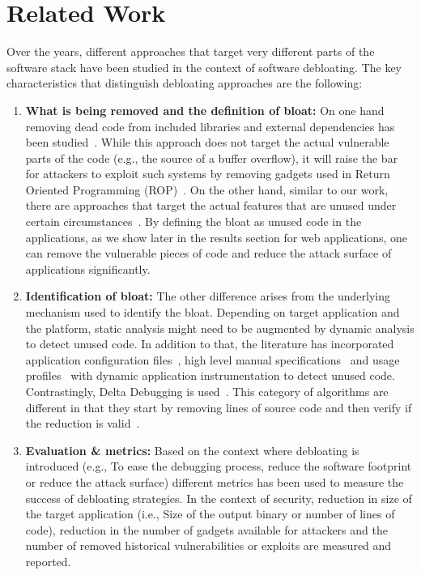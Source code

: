
\chapter{Related Work\label{ch:pastwork}}

Over the years, different approaches that target very different parts of the
software stack have been studied in the context of software debloating. The key characteristics that distinguish debloating approaches are the following:

\begin{enumerate}
  \item{\textbf{What is being removed and the definition of bloat:} On one hand removing dead code from included libraries and external dependencies has been studied~\cite{jiang2016Jred, jiang2018reddroid, quach2018debloating}. While this approach does not
  target the actual vulnerable parts of the code (e.g., the source of a buffer overflow), it will raise the bar for attackers to exploit such systems by removing gadgets used in Return Oriented Programming (ROP)~\cite{shacham2007geometry}.
  On the other hand, similar to our work, there are approaches that target the actual features that are unused under certain circumstances~\cite{boomsma2012Dead, heo2018effective, regehr2012CReduce, Snyder2017, sun2018perses}. By defining the bloat as unused code in the applications, as we show later in the results section for web applications, one can remove the vulnerable pieces of code and reduce the attack surface of applications significantly.}
  \item{\textbf{Identification of bloat:} The other difference arises from the underlying mechanism used to identify the bloat. Depending on target application and the platform, static analysis might need to be augmented by dynamic analysis to detect
  unused code. In addition to that, the literature has incorporated application configuration files~\cite{Koo:2019:CSD:3301417.3312501}, high level manual specifications~\cite{heo2018effective, sharif2018Trimmer} and usage profiles~\cite{boomsma2012Dead} with dynamic application instrumentation to detect unused code. Contrastingly, Delta Debugging is used~\cite{zeller2002Delta}. This category of algorithms are different in that they start by removing lines of source code and then verify if the reduction is valid~\cite{heo2018effective, regehr2012CReduce, sun2018perses}.}
  \item{\textbf{Evaluation \& metrics:} Based on the context where debloating is introduced (e.g., To ease the debugging process, reduce the software footprint or reduce the attack surface) different metrics has been used to measure the success of debloating strategies. In the context of security, reduction in size of the target application (i.e., Size of the output binary or number of lines of code), reduction in the number of gadgets available for attackers and the number of removed historical vulnerabilities or exploits are measured and reported.}
\end{enumerate}


